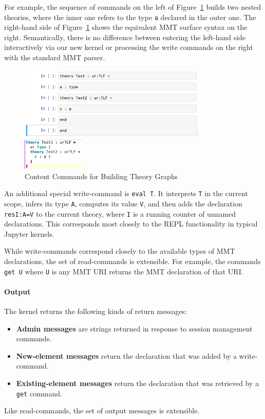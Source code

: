 For example, the sequence of commands on the left of Figure~\ref{fig:test_theory} builds two nested theories, where the inner one refers to the type \texttt{a} declared in the outer one.
The right-hand side of Figure~\ref{fig:test_theory} shows the equivalent MMT surface syntax on the right.
Semantically, there is no difference between entering the left-hand side interactively via our new kernel or processing the write commands on the right with the standard MMT parser.
\begin{figure}[ht]\centering
\begin{minipage}[c]{9cm}\includegraphics[width=9cm]{../D4.11/test_theory_jupyter}\end{minipage}
\begin{minipage}[c]{3cm}\includegraphics[width=3cm]{../D4.11/test_theory}\end{minipage}
\caption{Content Commands for Building Theory Graphs}\label{fig:test_theory}
\end{figure}

An additional special write-command is \texttt{eval T}.
It interprets \texttt{T} in the current scope, infers its type \texttt{A}, computes its value \texttt{V}, and then adds the declaration \texttt{resI:A=V} to the current theory, where \texttt{I} is a running counter of unnamed declarations.
This corresponds most closely to the REPL functionality in typical Jupyter kernels.

While write-commands correspond closely to the available types of MMT declarations, the set of read-commands is extensible.
For example, the commands \texttt{get U} where \texttt{U} is any MMT URI returns the MMT declaration of that URI.

\paragraph{Output}
The kernel returns the following kinds of return messages:
\begin{itemize}
\item \textbf{Admin messages} are strings returned in response to session management commands.
\item \textbf{New-element messages} return the declaration that was added by a write-command.
\item \textbf{Existing-element messages} return the declaration that was retrieved by a \texttt{get} command.
\end{itemize}
Like read-commands, the set of output messages is extensible.

